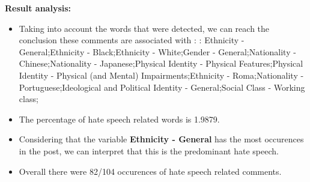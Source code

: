 \documentclass[11pt]{article}
\newlength\mylength
\begin{document}
\begin{center}
\begin{longtable}{|C{.50\mylength}|C{.30\mylength}|C{.15\mylength}|C{.15\mylength}|C{.15\mylength}|}
\end{longtable}
\end{center}


\textbf{\Large Result analysis:}

\begin{itemize}\item Taking into account the words that were detected, we can reach the conclusion these comments are associated with : : Ethnicity - General;Ethnicity - Black;Ethnicity - White;Gender - General;Nationality - Chinese;Nationality - Japanese;Physical Identity - Physical Features;Physical Identity - Physical (and Mental) Impairments;Ethnicity - Roma;Nationality - Portuguese;Ideological and Political Identity - General;Social Class - Working class;%

\item The percentage of hate speech related words is 1.9879.

\item Considering that the variable \textbf{Ethnicity - General} has the most occurences in the post, we can interpret that this is the predominant hate speech.

\item Overall there were 82/104 occurences of hate speech related comments.\end{itemize}
\end{document}

